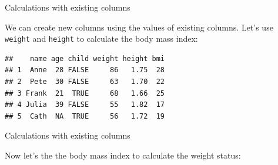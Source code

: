 \documentclass[ignorenonframetext,]{beamer}
\newenvironment{Shaded}{\begin{snugshade}}{\end{snugshade}}
\newcommand{\DecValTok}[1]{\textcolor[rgb]{0.00,0.00,0.81}{#1}}
\newcommand{\FloatTok}[1]{\textcolor[rgb]{0.00,0.00,0.81}{#1}}
\newcommand{\KeywordTok}[1]{\textcolor[rgb]{0.13,0.29,0.53}{\textbf{#1}}}
\newcommand{\NormalTok}[1]{#1}
\newcommand{\OperatorTok}[1]{\textcolor[rgb]{0.81,0.36,0.00}{\textbf{#1}}}
\newcommand{\StringTok}[1]{\textcolor[rgb]{0.31,0.60,0.02}{#1}}
\begin{document}
\begin{frame}[fragile]{Calculations with existing columns}
\protect\hypertarget{calculations-with-existing-columns}{}

We can create new columns using the values of existing columns. Let's
use \texttt{weight} and \texttt{height} to calculate the body mass
index:

\begin{Shaded}
\end{Shaded}

\begin{verbatim}
##    name age child weight height bmi
## 1  Anne  28 FALSE     86   1.75  28
## 2  Pete  30 FALSE     63   1.70  22
## 3 Frank  21  TRUE     68   1.66  25
## 4 Julia  39 FALSE     55   1.82  17
## 5  Cath  NA  TRUE     56   1.72  19
\end{verbatim}

\end{frame}

\begin{frame}[fragile]{Calculations with existing columns}
\protect\hypertarget{calculations-with-existing-columns-1}{}

Now let's the the body mass index to calculate the weight status:

\begin{Shaded}
\end{Shaded}

\end{frame}
\end{document}
